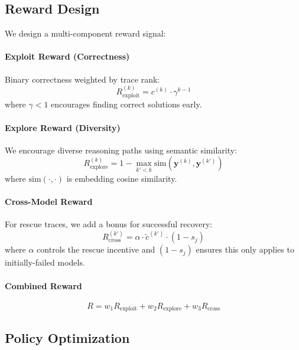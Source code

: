 \documentclass[11pt]{article}
\begin{document}
\subsection{Reward Design}

We design a multi-component reward signal:

\paragraph{Exploit Reward (Correctness)}
Binary correctness weighted by trace rank:
\begin{equation}
    R_{\text{exploit}}^{(k)} = c^{(k)} \cdot \gamma^{k-1}
\end{equation}
where $\gamma < 1$ encourages finding correct solutions early.

\paragraph{Explore Reward (Diversity)}
We encourage diverse reasoning paths using semantic similarity:
\begin{equation}
    R_{\text{explore}}^{(k)} = 1 - \max_{k' < k} \text{sim}(\mathbf{y}^{(k)}, \mathbf{y}^{(k')})
\end{equation}
where $\text{sim}(\cdot, \cdot)$ is embedding cosine similarity.

\paragraph{Cross-Model Reward}
For rescue traces, we add a bonus for successful recovery:
\begin{equation}
    R_{\text{cross}}^{(k')} = \alpha \cdot \tilde{c}^{(k')} \cdot (1 - s_j)
\end{equation}
where $\alpha$ controls the rescue incentive and $(1 - s_j)$ ensures this only applies to initially-failed models.

\paragraph{Combined Reward}
\begin{equation}
    R = w_1 R_{\text{exploit}} + w_2 R_{\text{explore}} + w_3 R_{\text{cross}}
\end{equation}

\subsection{Policy Optimization}
\end{document}

